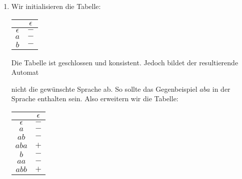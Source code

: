 \documentclass[11pt,a4paper]{article}
\begin{document}
\begin{loesung}
    \begin{enumerate}
        \item Wir initialisieren die Tabelle:
        \begin{table}[h!]
            \centering
            \begin{tabular}{c|c}
                & $\epsilon$ \\
                \hline
                $\epsilon$ & $-$ \\
                \hline
                $a$ & $-$ \\
                $b$ & $-$ \\
            \end{tabular}
        \end{table}
        \FloatBarrier
        Die Tabelle ist geschlossen und konsistent.
        Jedoch bildet der resultierende Automat
        \begin{figure*}[h!]
            \centering
        \end{figure*}
        \FloatBarrier
        nicht die gewünschte Sprache ab. So sollte das Gegenbeispiel $aba$ in der Sprache enthalten sein.
        Also erweitern wir die Tabelle:
        \begin{table}[h!]
            \centering
            \begin{tabular}{c|c}
                & $\epsilon$ \\
                \hline
                $\epsilon$ & $-$ \\
                $a$ & $-$ \\
                $ab$ & $-$ \\
                $aba$ & $+$ \\
                \hline
                $b$ & $-$ \\
                $aa$ & $-$ \\
                $abb$ & $+$ \\

\end{tabular}
\end{table}
\end{enumerate}
\end{loesung}
\end{document}
